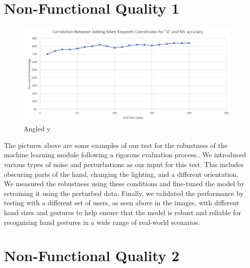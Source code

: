 \documentclass[12pt, titlepage]{article}
\begin{document}
\section{Non-Functional Quality 1}	

\begin{figure}[H] 
\centering
\includegraphics[width=\textwidth,height=0.4\textheight,keepaspectratio]{correlation.PNG} 
\caption{Angled y} 
\label{Fig.Correlation} 
\end{figure}

The pictures above are some examples of our test for the robustness of the machine learning 
module following a rigorous evaluation process.. We introduced various types of noise and 
perturbations as our input for this test. This includes obscuring parts of the hand, changing
the lighting, and a different orientation. We measured the robustness using these conditions
and fine-tuned the model by retraining it using the perturbed data. Finally, we validated the
performance by testing with a different set of users, as seen above in the images, with different
hand sizes and gestures to help ensure that the model is robust and reliable for recognizing hand
gestures in a wide range of real-world scenarios.


\section{Non-Functional Quality 2}
\end{document}
